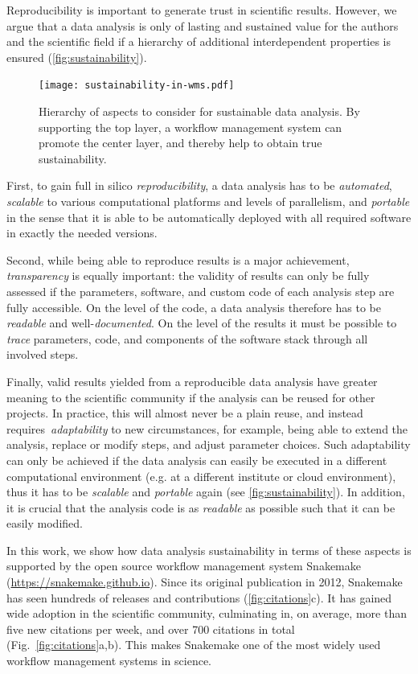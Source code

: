\documentclass[parskip=half, DIV=18]{scrartcl}
\let\plainurl\url
\renewcommand{\url}[1]{\protect\plainurl{#1}}
\begin{document}
Reproducibility is important to generate trust in scientific results.
However, we argue that a data analysis is only of lasting and sustained value for the authors and the scientific field if a hierarchy of additional interdependent properties is ensured (\autoref{fig:sustainability}).

\begin{figure}
    \centering
	\texttt{[image: sustainability-in-wms.pdf]}
	\caption{
		Hierarchy of aspects to consider for sustainable data analysis.
		By supporting the top layer, a workflow management system can promote the center layer, and thereby help to obtain true sustainability.
	}\label{fig:sustainability}
\end{figure}

First, to gain full in silico \emph{reproducibility}, a data analysis has to be \emph{automated}, \emph{scalable} to various computational platforms and levels of parallelism, and \emph{portable} in the sense that it is able to be automatically deployed with all required software in exactly the needed versions.

Second, while being able to reproduce results is a major achievement, \emph{transparency} is equally important: the validity of results can only be fully assessed if the parameters, software, and custom code of each analysis step are fully accessible.
On the level of the code, a data analysis therefore has to be \emph{readable} and well-\emph{documented}.
On the level of the results it must be possible to \emph{trace} parameters, code, and components of the software stack through all involved steps.

Finally, valid results yielded from a reproducible data analysis have greater meaning to the scientific community if the analysis can be reused for other projects.
In practice, this will almost never be a plain reuse, and instead requires~\emph{adaptability} to new circumstances, for example, being able to extend the analysis, replace or modify steps, and adjust parameter choices.
Such adaptability can only be achieved if the data analysis can easily be executed in a different computational environment (e.g. at a different institute or cloud environment), thus it has to be \emph{scalable} and \emph{portable} again (see \autoref{fig:sustainability}).
In addition, it is crucial that the analysis code is as \emph{readable} as possible such that it can be easily modified.

In this work, we show how data analysis sustainability in terms of these aspects is supported by the open source workflow management system Snakemake (\url{https://snakemake.github.io}).
Since its original publication in 2012, Snakemake has seen hundreds of releases and contributions (\autoref{fig:citations}c).
It has gained wide adoption in the scientific community, culminating in, on average, more than five new citations per week, and over 700 citations in total (Fig.~\ref{fig:citations}a,b).
This makes Snakemake one of the most widely used workflow management systems in science.
\end{document}
